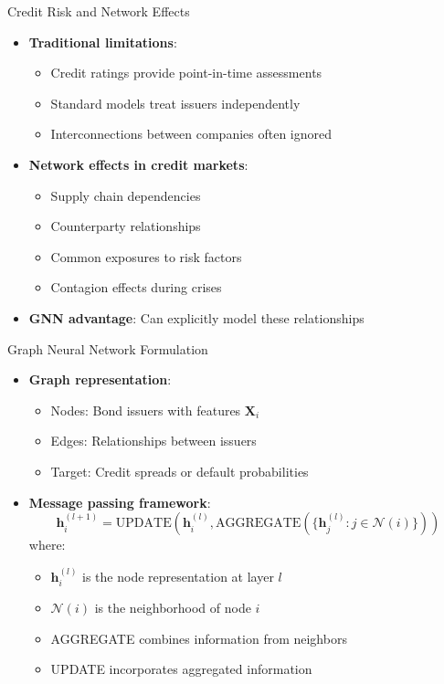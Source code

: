 \documentclass{beamer}
\begin{document}
\begin{frame}{Credit Risk and Network Effects}
\begin{itemize}
    \item \textbf{Traditional limitations}:
    \begin{itemize}
        \item Credit ratings provide point-in-time assessments
        \item Standard models treat issuers independently
        \item Interconnections between companies often ignored
    \end{itemize}
    \item \textbf{Network effects in credit markets}:
    \begin{itemize}
        \item Supply chain dependencies
        \item Counterparty relationships
        \item Common exposures to risk factors
        \item Contagion effects during crises
    \end{itemize}
    \item \textbf{GNN advantage}: Can explicitly model these relationships
\end{itemize}
\end{frame}

\begin{frame}{Graph Neural Network Formulation}
\begin{itemize}
    \item \textbf{Graph representation}:
    \begin{itemize}
        \item Nodes: Bond issuers with features $\mathbf{X}_i$
        \item Edges: Relationships between issuers
        \item Target: Credit spreads or default probabilities
    \end{itemize}
    \item \textbf{Message passing framework}:
    \begin{equation}
    \mathbf{h}_i^{(l+1)} = \text{UPDATE}\left(\mathbf{h}_i^{(l)}, \text{AGGREGATE}\left(\{\mathbf{h}_j^{(l)} : j \in \mathcal{N}(i)\}\right)\right)
    \end{equation}
    where:
    \begin{itemize}
        \item $\mathbf{h}_i^{(l)}$ is the node representation at layer $l$
        \item $\mathcal{N}(i)$ is the neighborhood of node $i$
        \item AGGREGATE combines information from neighbors
        \item UPDATE incorporates aggregated information
    \end{itemize}
\end{itemize}
\end{frame}
\end{document}
